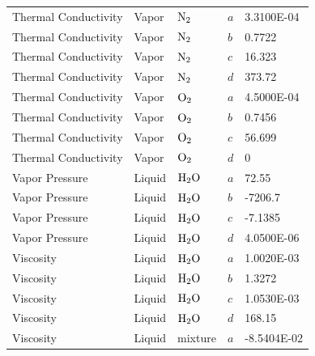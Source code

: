 \documentclass[a4paper,fleqn]{cas-sc}
\begin{document}
\begin{longtable}{lllll}
        Thermal Conductivity      & Vapor          & $\ce{N2}$           & $a$               & 3.3100E-04     \\
        Thermal Conductivity      & Vapor          & $\ce{N2}$           & $b$               & 0.7722         \\
        Thermal Conductivity      & Vapor          & $\ce{N2}$           & $c$               & 16.323         \\
        Thermal Conductivity      & Vapor          & $\ce{N2}$           & $d$               & 373.72         \\
        Thermal Conductivity      & Vapor          & $\ce{O2}$           & $a$               & 4.5000E-04     \\
        Thermal Conductivity      & Vapor          & $\ce{O2}$           & $b$               & 0.7456         \\
        Thermal Conductivity      & Vapor          & $\ce{O2}$           & $c$               & 56.699         \\
        Thermal Conductivity      & Vapor          & $\ce{O2}$           & $d$               & 0              \\
        Vapor Pressure            & Liquid         & $\ce{H2O}$          & $a$               & 72.55          \\
        Vapor Pressure            & Liquid         & $\ce{H2O}$          & $b$               & -7206.7        \\
        Vapor Pressure            & Liquid         & $\ce{H2O}$          & $c$               & -7.1385        \\
        Vapor Pressure            & Liquid         & $\ce{H2O}$          & $d$               & 4.0500E-06     \\
        Viscosity                 & Liquid         & $\ce{H2O}$          & $a$               & 1.0020E-03     \\
        Viscosity                 & Liquid         & $\ce{H2O}$          & $b$               & 1.3272         \\
        Viscosity                 & Liquid         & $\ce{H2O}$          & $c$               & 1.0530E-03     \\
        Viscosity                 & Liquid         & $\ce{H2O}$          & $d$               & 168.15         \\
        Viscosity                 & Liquid         & mixture             & $a$               & -8.5404E-02    \\

\end{longtable}
\end{document}
